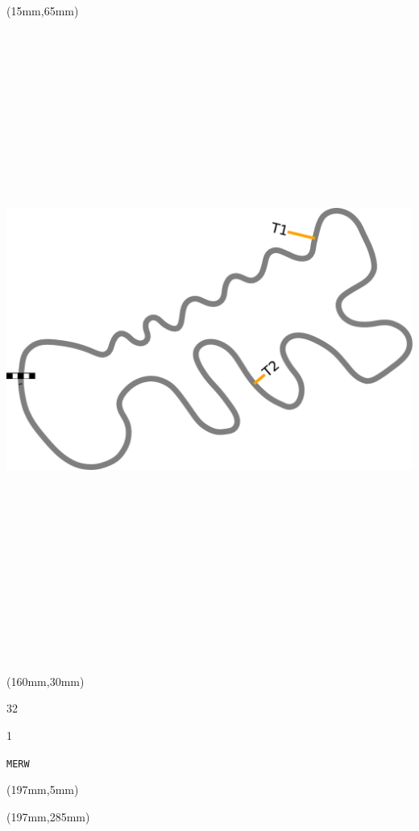 \begin{textblock*}{185mm}(15mm,65mm)%
\centering
\mbox{\includegraphics[width=185mm,height=210mm,keepaspectratio]{PT/MERW.pdf}}
\end{textblock*}
\begin{textblock*}{40mm}(160mm,30mm)%
\Large
\par{} 
\par32 
\par1 
\par\hfill\tiny\tt MERW\\
\end{textblock*}
\begin{textblock*}{20mm}(197mm,5mm)%
\fbox{\thepage}
\label{MERW}
\end{textblock*}
\begin{textblock*}{20mm}(197mm,285mm)%
\fbox{\thepage}
\end{textblock*}

